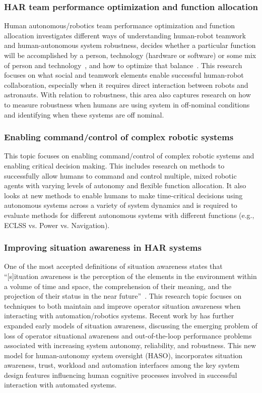 \subsubsection{HAR team performance optimization and function allocation}
Human autonomous/robotics team performance optimization and function allocation investigates different ways of understanding human-robot teamwork and human-autonomous system robustness, decides whether a particular function will be accomplished by a person, technology (hardware or software) or some mix of person and technology~\citep{fitts_human_1951}, and how to optimize that balance~\citep{yanco_analysis_2015}.
This research focuses on what social and teamwork elements enable successful human-robot collaboration, especially when it requires direct interaction between robots and astronauts.
With relation to robustness, this area also captures research on how to measure robustness when humans are using system in off-nominal conditions and identifying when these systems are off nominal.

\subsubsection{Enabling command/control of complex robotic systems}
This topic focuses on enabling command/control of complex robotic systems and enabling critical decision making.
This includes research on methods to successfully allow humans to command and control multiple, mixed robotic agents with varying levels of autonomy and flexible function allocation.
It also looks at new methods to enable humans to make time-critical decisions using autonomous systems across a variety of system dynamics and is required to evaluate methods for different autonomous systems with different functions (e.g., ECLSS vs. Power vs. Navigation).

\subsubsection{Improving situation awareness in HAR systems}
One of the most accepted definitions of situation awareness states that ``[s]ituation awareness is the perception of the elements in the environment within a volume of time and space, the comprehension of their meaning, and the projection of their status in the near future''~\citep{endsley2017toward}.
This research topic focuses on techniques to both maintain and improve operator situation awareness when interacting with automation/robotics systems.
Recent work by \citeauthor{endsley_here_2017} has further expanded early models of situation awareness, discussing the emerging problem of loss of operator situational awareness and out-of-the-loop performance problems associated with increasing system autonomy, reliability, and robustness.
This new model for human-autonomy system oversight (HASO), incorporates situation awareness, trust, workload and automation interfaces among the key system design features influencing human cognitive processes involved in successful interaction with automated systems.

